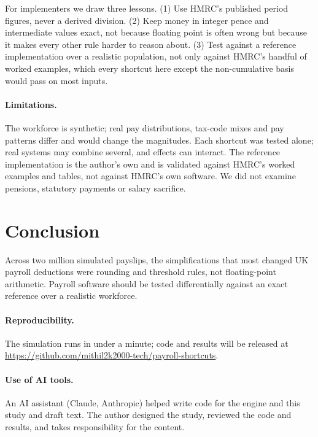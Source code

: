 \documentclass[11pt]{article}
\begin{document}
For implementers we draw three lessons. (1) Use HMRC's published period figures, never a derived division. (2) Keep money in integer
pence and intermediate values exact, not because floating point is often wrong but because it makes every other rule harder to reason
about. (3) Test against a reference implementation over a realistic population, not only against HMRC's handful of worked examples,
which every shortcut here except the non-cumulative basis would pass on most inputs.

\paragraph{Limitations.} The workforce is synthetic; real pay distributions, tax-code mixes and pay patterns differ and would change the
magnitudes. Each shortcut was tested alone; real systems may combine several, and effects can interact. The reference implementation is
the author's own and is validated against HMRC's worked examples and tables, not against HMRC's own software. We did not examine
pensions, statutory payments or salary sacrifice.

\section{Conclusion}
Across two million simulated payslips, the simplifications that most changed UK payroll deductions were rounding and threshold rules,
not floating-point arithmetic. Payroll software should be tested differentially against an exact reference over a realistic workforce.

\paragraph{Reproducibility.} The simulation runs in under a minute; code and results will be released at
\newline\url{https://github.com/mithil2k2000-tech/payroll-shortcuts}.

\paragraph{Use of AI tools.} An AI assistant (Claude, Anthropic) helped write code for the engine and this study and draft text. The
author designed the study, reviewed the code and results, and takes responsibility for the content.



\end{document}
